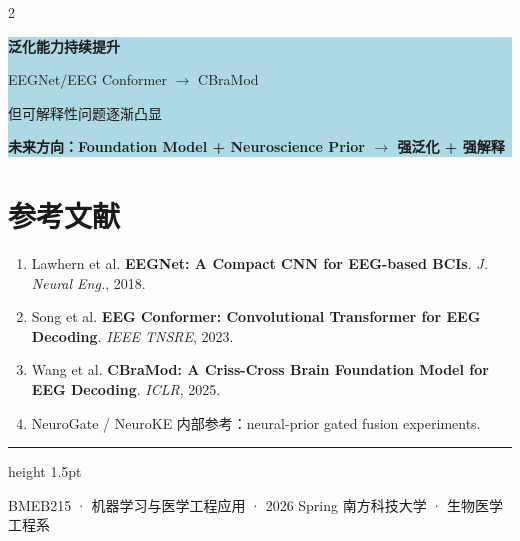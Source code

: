 \documentclass[12pt, a0paper]{article}
\renewcommand{\normalsize}{\fontsize{21}{28}\selectfont}
\renewcommand{\large}{\fontsize{26}{34}\selectfont}
\renewcommand{\Large}{\fontsize{30}{38}\selectfont}
\renewcommand{\footnotesize}{\fontsize{14}{18}\selectfont}
\begin{document}
\begin{multicols}{2}
\begin{center}
\colorbox{lightblue}{\parbox{0.95\columnwidth}{\centering
    \vspace{0.6em}
    {\Large\bfseries
        泛化能力持续提升\par}
    \vspace{1em}
    {\normalsize
        EEGNet/EEG Conformer $\rightarrow$ CBraMod\par}
    \vspace{0.6em}
    {\normalsize
        但可解释性问题逐渐凸显\par}
    \vspace{1em}
    {\large\bfseries
        未来方向：Foundation Model + Neuroscience Prior
        $\rightarrow$ 强泛化 + 强解释\par}
    \vspace{0.6em}
}}
\end{center}

\vspace{0.5em}
\section*{参考文献}

{\footnotesize
\begin{enumerate}[leftmargin=1.5em, itemsep=0.1em]
    \item Lawhern et al. \textbf{EEGNet: A Compact CNN for EEG-based BCIs}. \textit{J. Neural Eng.}, 2018.
    \item Song et al. \textbf{EEG Conformer: Convolutional Transformer for EEG Decoding}. \textit{IEEE TNSRE}, 2023.
    \item Wang et al. \textbf{CBraMod: A Criss-Cross Brain Foundation Model for EEG Decoding}. \textit{ICLR}, 2025.
    \item NeuroGate / NeuroKE 内部参考：neural-prior gated fusion experiments.
\end{enumerate}
}

\end{multicols}

\vspace{2mm}
{\color{myblue}\hrule height 1.5pt}
\vspace{2mm}
\begin{center}
{\footnotesize\color{mygray}
    BMEB215 · 机器学习与医学工程应用 · 2026 Spring \hspace{3em}
    南方科技大学 · 生物医学工程系
}
\end{center}
\end{document}
